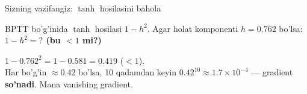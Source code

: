 \documentclass[aspectratio=169,11pt]{beamer}
\begin{document}
\begin{frame}{Sizning vazifangiz: $\tanh$ hosilasini bahola}
  \begin{tcolorbox}[warnbox,title=Savol --- 90 soniya]
    \small
    BPTT bo'g'inida $\tanh$ hosilasi $1-h^2$. Agar holat komponenti $h=0.762$
    bo'lsa:\\[4pt]
    \textbf{\large $1-h^2 = ?$ \quad (bu $<1$ mi?)}
  \end{tcolorbox}
  \pause
  \begin{tcolorbox}[okbox,title=Javob]
    \small
    $1 - 0.762^2 = 1 - 0.581 = \mathbf{0.419}$ \; ($<1$).\\[3pt]
    \footnotesize Har bo'g'in $\approx 0.42$ bo'lsa, 10 qadamdan keyin
    $0.42^{10}\approx 1.7\times10^{-4}$ --- gradient \textbf{so'nadi}. Mana
    vanishing gradient.
  \end{tcolorbox}
\end{frame}
\end{document}
